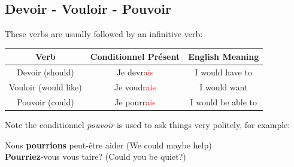\documentclass{book}
\begin{document}
\subsection{Devoir - Vouloir - Pouvoir}
These verbs are usually followed by an infinitive verb:
\begin{center}
    \begin{tabular}{|c|c|c|}
        \hline
        \textbf{Verb} & \textbf{Conditionnel Présent} & \textbf{English Meaning} \\
        \hline
        Devoir (should) & Je devr\textcolor{red}{ais} & I would have to \\
        \hline
        Vouloir (would like) & Je voudr\textcolor{red}{ais} & I would want \\
        \hline
        Pouvoir (could) & Je pourr\textcolor{red}{ais} & I would be able to \\
        \hline
    \end{tabular}
\end{center}
Note the conditionnel \textit{pouvoir} is used to ask things very politely, for example:
\begin{center}
    Nous \textbf{pourrions} peut-être aider (We could maybe help) \\
    \textbf{Pourriez}-vous vous taire? (Could you be quiet?)
\end{center}
\end{document}
